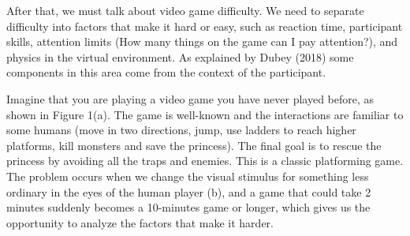 After that, we must talk about video game difficulty. We need to separate difficulty into factors that make it hard or easy, such as reaction time, participant skills, attention limits (How many things on the game can I pay attention?), and physics in the virtual environment. As explained by Dubey (2018) some components in this area come from the context of the participant.  \cite{Dubey2018HumanPriors}

Imagine that you are playing a video game you have never played before, as shown in Figure 1(a). The game is well-known and the interactions are familiar to some humans (move in two directions, jump, use ladders to reach higher platforms, kill monsters and save the princess). The final goal is to rescue the princess by avoiding all the traps and enemies. This is a classic platforming game. 
The problem occurs when we change the visual stimulus for something less ordinary in the eyes of the human player (b), and a game that could take  2 minutes suddenly becomes a 10-minutes game or longer, which gives us the opportunity to analyze the factors that make it harder.
\cite{Dubey2018HumanPriors}



